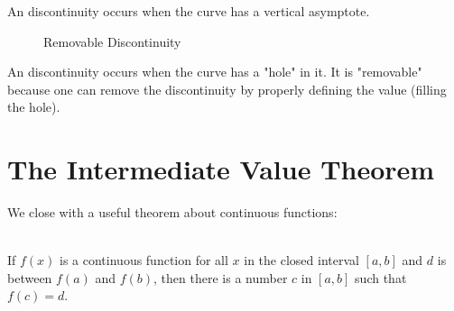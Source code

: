 \begin{definition}
    An  discontinuity occurs when the curve has a vertical asymptote.
    \label{essential discontinuity}
    \\\cite{ap}
\end{definition}
\begin{figure}[H]
    \centering
    \caption{Removable Discontinuity \cite{mooc}}
    \label{plot:removable}
\end{figure}
\begin{definition}
    An  discontinuity occurs when the curve has a "hole" in it. It is "removable" because one can remove the discontinuity by properly defining the value (filling the hole).
    \\\cite{ap}
\end{definition}

\section{The Intermediate Value Theorem}
We close with a useful theorem about continuous functions:

\begin{theorem}\label{theorem:IVT}~\\
If $f(x)$ is a continuous function for all $x$ in the closed interval $[a,b]$ and $d$ is between $f(a)$ and $f(b)$, then there is a number $c$ in $[a, b]$ such that $f(c) = d$.
\\\cite{mooc}
\end{theorem}

